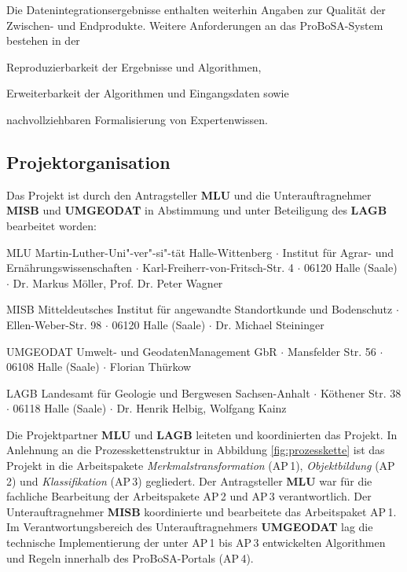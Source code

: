 Die Datenintegrationsergebnisse enthalten weiterhin Angaben zur Qualität der Zwischen- und Endprodukte. Weitere Anforderungen an das ProBoSA-System bestehen in der 

\begin{compactitem}
\item Reproduzierbarkeit der Ergebnisse und Algorithmen,
\item Erweiterbarkeit der Algorithmen und Eingangsdaten sowie
\item nachvollziehbaren Formalisierung von Expertenwissen.
\end{compactitem}


\subsection{Projektorganisation}
Das Projekt ist durch den Antragsteller \textbf{MLU} und die Unterauftragnehmer \textbf{MISB} und \textbf{UMGEODAT} in Abstimmung und unter Beteiligung des \textbf{LAGB}  bearbeitet worden:

\begin{compactdesc}
\item[MLU] Martin-Luther-Uni"-ver"-si"-tät Halle-Wittenberg $\cdot$ Institut für Agrar- und Ernährungswissenschaften  $\cdot$ Karl-Freiherr-von-Fritsch-Str. 4 $\cdot$ 06120 Halle (Saale) $\cdot$ Dr. Markus Möller, Prof. Dr. Peter Wagner
\item[MISB] Mitteldeutsches Institut für angewandte Standortkunde und Bodenschutz $\cdot$ Ellen-Weber-Str. 98 $\cdot$ 06120 Halle (Saale) $\cdot$ Dr. Michael Steininger
\item[UMGEODAT] Umwelt- und GeodatenManagement GbR $\cdot$ Mansfelder Str. 56 $\cdot$ 06108 Halle (Saale) $\cdot$ Florian Thürkow
\item[LAGB] Landesamt für Geologie und Bergwesen Sachsen-Anhalt $\cdot$ Köthener Str. 38 $\cdot$ 06118 Halle (Saale) $\cdot$ Dr. Henrik Helbig, Wolfgang Kainz
\end{compactdesc}


Die Projektpartner \textbf{MLU} und \textbf{LAGB} leiteten und koordinierten das Projekt. In Anlehnung an die Prozesskettenstruktur in Abbildung \ref{fig:prozesskette}  ist das Projekt in die Arbeitspakete \textit{Merkmalstransformation} (AP\,1), \textit{Objektbildung} (AP\,2) und \textit{Klassifikation} (AP\,3) gegliedert. Der Antragsteller \textbf{MLU} war für die fachliche Bearbeitung der Arbeitspakete AP\,2 und  AP\,3 verantwortlich. Der Unterauftragnehmer \textbf{MISB} koordinierte und bearbeitete das Arbeitspaket AP\,1. Im Verantwortungsbereich des Unterauftragnehmers \textbf{UMGEODAT} lag die technische Implementierung der unter AP\,1 bis AP\,3 entwickelten Algorithmen und Regeln innerhalb des ProBoSA-Portals (AP\,4). 

